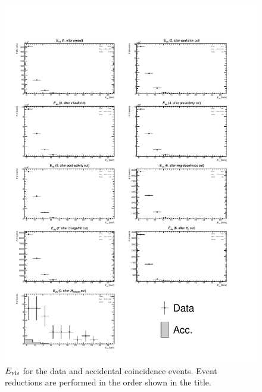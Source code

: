 \begin{figure}[h]
	\centering
	\includegraphics[width=15cm]{PDF/Dist_Data/Che_50deg_tag_ge1/erec}
	\caption[$E_{\rm vis}$ for the data and accidental coincidence events]{
	$E_{\rm vis}$ for the data and accidental coincidence events.
	Event reductions are performed in the order shown in the title.
	}\label{Data_erec}
\end{figure}

